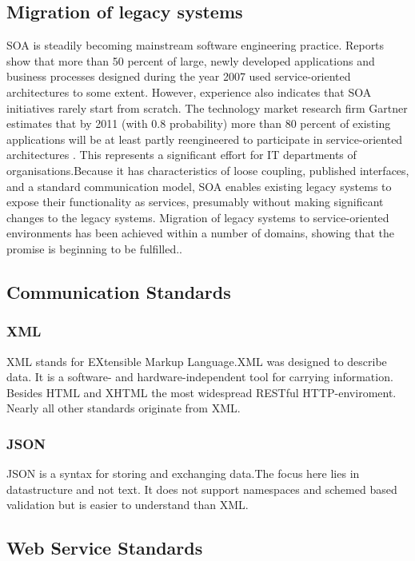 \documentclass[12pt]{article}
\begin{document}
\subsection{Migration of legacy systems}
SOA is steadily becoming mainstream software engineering practice. Reports show that more than 50 percent of large, newly developed applications and business processes designed during the year 2007 used service-oriented architectures to some extent. However, experience also indicates that SOA initiatives rarely start from scratch. The technology market research firm Gartner estimates that by 2011 (with 0.8 probability) more than 80 percent of existing applications will be at least partly reengineered to participate in service-oriented architectures . This represents a significant effort for IT departments of organisations.Because it has characteristics of loose coupling, published interfaces, and a standard communication model, SOA enables existing legacy systems to expose their functionality as services, presumably without making significant changes to the legacy systems. Migration of legacy systems to service-oriented environments has been achieved within a number of domains, showing that the promise is beginning to be fulfilled.\cite{legacy}.
\\
\subsection{Communication Standards}

\subsubsection{XML}
XML stands for EXtensible Markup Language.XML was designed to describe data.
It is a software- and hardware-independent tool for carrying information.\\
Besides HTML and XHTML the most widespread RESTful HTTP-enviroment.\\
Nearly all other standards originate from XML.
\subsubsection{JSON}
JSON is a syntax for storing and exchanging data.The focus here lies in datastructure and not text.
It does not support namespaces and schemed based validation but is easier to understand than XML.

\subsection{Web Service Standards}
\end{document}
